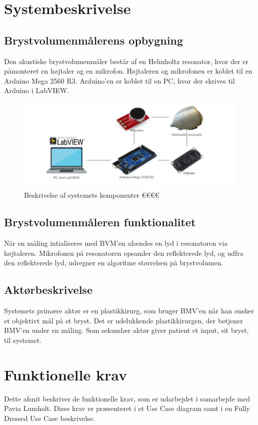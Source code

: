 	\section{Systembeskrivelse}

		\subsection*{Brystvolumenmålerens opbygning}
		Den akustiske brystvolumenmåler består af en Helmholtz resonator, hvor der er påmonteret en højtaler og en mikrofon. Højtaleren og mikrofonen er koblet til en Arduino Mega 2560 R3. Arduino'en er koblet til en PC, hvor der skrives til Arduino i LabVIEW. \\ 
		
		\begin{figure}[htb]
			\centering
			\includegraphics[width=5in]{systembeskrivelse}
			\caption{Beskrivelse af systemets komponenter €€€€}
			\label{system}
		\end{figure}
	
		\subsection*{Brystvolumenmåleren funktionalitet}
		Når en måling intialiseres med BVM'en afsendes en lyd i resonatoren via højtaleren. Mikrofonen på resonatoren opsamler den reflekterede lyd, og udfra den reflekterede lyd, udregner en algoritme størrelsen på brystvolumen. 
	
		\subsection{Aktørbeskrivelse}
		Systemets primære aktør er en plastikkirurg, som bruger BMV'en når han ønsker et objektivt mål på et bryst. Det er udelukkende plastikkirurgen, der  betjener BMV'en under en måling. Som sekundær aktør giver patient et input, sit bryst, til systemet. 
	
	\section{Funktionelle krav}	
	Dette afsnit beskriver de funktionelle krav, som er udarbejdet i samarbejde med Pavia Lumholt. Disse krav er præsenteret i et Use Case diagram samt i en Fully Dressed Use Case beskrivelse.  
	
